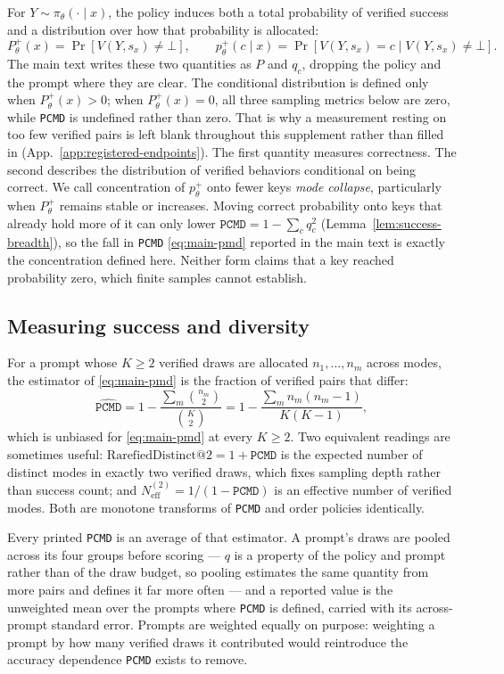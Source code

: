 \documentclass{article}
\newcommand{\1}{\mathbf 1}
\newcommand{\pmd}{\texttt{PCMD}}
\newcommand{\neff}{\ensuremath{N^{(2)}_{\mathrm{eff}}}}
\theoremstyle{remark}
\theoremstyle{definition}
\theoremstyle{plain}
\begin{document}
For $Y\sim\pi_\theta(\cdot\mid x)$, the policy induces both a total probability
of verified success and a distribution over how that probability is allocated:
\[
 P_\theta^+(x)=\Pr[V(Y,s_x)\neq\bot],
 \qquad
 p_\theta^+(c\mid x)=\Pr[V(Y,s_x)=c\mid V(Y,s_x)\neq\bot].
\]
The main text writes these two quantities as $P$ and $q_c$, dropping the
policy and the prompt where they are clear.
The conditional distribution is defined only when $P_\theta^+(x)>0$;
when $P_\theta^+(x)=0$, all three sampling metrics below are zero, while
\pmd{} is undefined rather than zero. That is why a measurement resting on too
few verified pairs is left blank throughout this supplement rather than filled
in (App.~\ref{app:registered-endpoints}).
The first quantity measures correctness. The second describes the distribution
of verified behaviors conditional on being correct. We call concentration of
$p_\theta^+$ onto fewer keys \emph{mode collapse}, particularly when
$P_\theta^+$ remains stable or increases.
Moving correct probability onto keys that already hold more of it can only
lower $\pmd{}=1-\sum_c q_c^2$ (Lemma~\ref{lem:success-breadth}), so the fall in
\pmd{} \eqref{eq:main-pmd} reported in the main text is exactly the
concentration defined here. Neither form claims that a key
reached probability zero, which finite samples cannot establish.

\subsection{Measuring success and diversity}
\label{app:metric-sampling}

For a prompt whose $K\ge2$ verified draws are allocated $n_1,\dots,n_m$ across
modes, the estimator of \eqref{eq:main-pmd} is the fraction of verified pairs
that differ:
\begin{equation}
 \widehat{\pmd}
 =1-\frac{\sum_m \binom{n_m}{2}}{\binom{K}{2}}
 =1-\frac{\sum_m n_m(n_m-1)}{K(K-1)},
 \label{eq:main-pmd-estimator}
\end{equation}
which is unbiased for \eqref{eq:main-pmd} at every $K\ge2$. Two equivalent
readings are sometimes useful: $\mathrm{RarefiedDistinct@}2=1+\pmd$ is the
expected number of distinct modes in exactly two verified draws, which fixes
sampling depth rather than success count; and $\neff=1/(1-\pmd)$ is an
effective number of verified modes. Both are monotone transforms of \pmd{} and
order policies identically.

Every printed \pmd{} is an average of that estimator. A prompt's draws are
pooled across its four groups before scoring --- $q$ is a property of the
policy and prompt rather than of the draw budget, so pooling estimates the
same quantity from more pairs and defines it far more often --- and a
reported value is the unweighted mean over the prompts where \pmd{} is
defined, carried with its across-prompt standard error. Prompts are weighted
equally on purpose: weighting a prompt by how many verified draws it
contributed would reintroduce the accuracy dependence \pmd{} exists to
remove.
\end{document}
